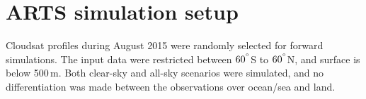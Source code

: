 \documentclass[amt, manuscript]{copernicus}
\begin{document}




\appendix
\section{ARTS simulation setup}    %
\label{appendix:ARTS_setup}
%
Cloudsat profiles during August 2015 were randomly selected for forward simulations. The input data were restricted between $60^{^{\circ}}$S to $60^{^{\circ}}$N, and surface is below 500\,m. Both clear-sky and all-sky scenarios were simulated, and no differentiation was made between the observations over ocean/sea and land. 
\end{document}
